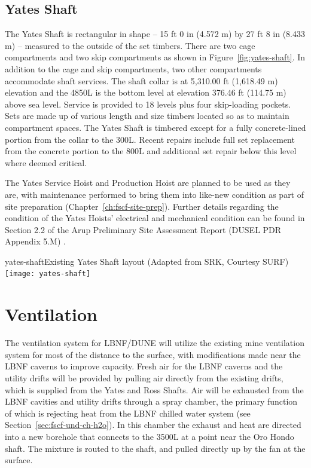 \subsection{Yates Shaft}
\label{sec:fscf-und-shafts-yates}

The Yates Shaft is rectangular in shape -- 15 ft 0 in (4.572 m) by 27 ft 8 in (8.433 m) -- measured to the outside of the set timbers. There are two cage compartments and two skip compartments as shown in Figure~\ref{fig:yates-shaft}. In addition to the cage and skip compartments, two other compartments accommodate shaft services. The shaft collar is at 5,310.00 ft (1,618.49 m) elevation and the 4850L is the bottom level at elevation 376.46 ft (114.75 m) above sea level. Service is provided to 18 levels plus four skip-loading pockets. Sets are made up of various length and size timbers located so as to maintain compartment spaces. 
 The Yates Shaft is timbered except for a fully concrete-lined portion from the collar to the 300L. Recent repairs include full set replacement from the concrete portion to the 800L and additional set repair below this level where deemed critical.

The Yates Service Hoist and Production Hoist are planned to be used as they are, with maintenance performed to bring them into like-new condition as part of site preparation (Chapter~\ref{ch:fscf-site-prep}). Further details regarding the condition of the Yates Hoists' electrical and mechanical condition can be found in Section 2.2 of the Arup Preliminary Site Assessment Report (DUSEL PDR Appendix 5.M) .

\begin{cdrfigure}{yates-shaft}{Existing Yates Shaft layout (Adapted from SRK, Courtesy SURF)}
\texttt{[image: yates-shaft]}
\end{cdrfigure}



\section{Ventilation}
\label{sec:fscf-und-vent}

The ventilation system for LBNF/DUNE will utilize the existing mine ventilation system for most of the distance to the surface, with modifications made near the LBNF caverns to improve capacity. Fresh air for the LBNF caverns and the utility drifts will be provided by pulling air directly from the existing drifts, which is supplied from the Yates and Ross Shafts. 
%
Air will be exhausted from the LBNF cavities and utility drifts through a spray chamber, the primary function of which is rejecting heat from the LBNF chilled water system (see Section~\ref{sec:fscf-und-ch-h2o}). In this chamber 
the exhaust and heat are directed into a new borehole that connects to the 3500L at a point near the Oro Hondo shaft. The mixture is routed to the shaft, and pulled directly up by the fan at the surface.

